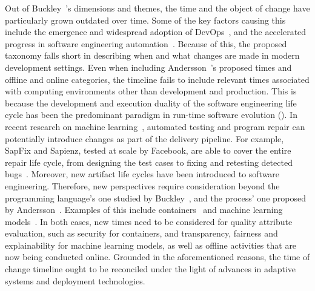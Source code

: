 Out of Buckley~\etal{}'s dimensions and themes, the time and the object of change have particularly grown outdated over time. Some of the key factors causing this include the emergence and widespread adoption of DevOps~\cite{riungu-kalliosaari-2016-devops,lwakatare-2019-devops,luz-2019-adopting}, and the accelerated progress in software engineering automation~\cite{humble-2010-continuous}. Because of this, the proposed taxonomy falls short in describing when and what changes are made in modern development settings. Even when including Andersson~\etal{}'s proposed times and offline and online categories, the timeline fails to include relevant times associated with computing environments other than development and production. This is because the development and execution duality of the software engineering life cycle has been the predominant paradigm in run-time software evolution (). In recent research on machine learning~\cite{shafiq-2021-literature}, automated testing and program repair can potentially introduce changes as part of the delivery pipeline. For example, SapFix and Sapienz, tested at scale by Facebook, are able to cover the entire repair life cycle, from designing the test cases to fixing and retesting detected bugs~\cite{mao-2016-sapienz,marginean-2019-sapfix}. Moreover, new artifact life cycles have been introduced to software engineering. Therefore, new perspectives require consideration beyond the programming language's one studied by Buckley~\etal{}, and the process' one proposed by Andersson~\etal{}. Examples of this include containers~\cite{syed-2015-software} and machine learning models~\cite{amershi-2019-software}. In both cases, new times need to be considered for quality attribute evaluation, such as security for containers, and transparency, fairness and explainability for machine learning models, as well as offline activities that are now being conducted online. Grounded in the aforementioned reasons, the time of change timeline ought to be reconciled under the light of advances in adaptive systems and deployment technologies.

